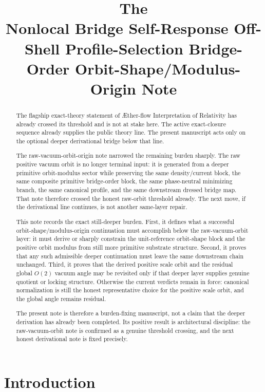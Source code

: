 \documentclass[11pt]{article}
\title{\textbf{The \TheoryName{}}\\[0.4em]
\large Nonlocal Bridge Self-Response Off-Shell Profile-Selection Bridge-Order Orbit-Shape/Modulus-Origin Note}
\author{}
\date{}
\newcommand{\Aflow}{\AE{}ther-flow}
\newcommand{\TheoryName}{\Aflow{} Interpretation of Relativity}
\begin{document}
\maketitle

\begin{abstract}
The flagship exact-theory statement of \TheoryName{} has already crossed its threshold and is not at stake here. The active exact-closure sequence already supplies the public theory line. The present manuscript acts only on the optional deeper derivational bridge below that line.

The raw-vacuum-orbit-origin note narrowed the remaining burden sharply. The raw positive vacuum orbit is no longer terminal input: it is generated from a deeper primitive orbit-modulus sector while preserving the same density/current block, the same composite primitive bridge-order block, the same phase-neutral minimizing branch, the same canonical profile, and the same downstream dressed bridge map. That note therefore crossed the honest raw-orbit threshold already. The next move, if the derivational line continues, is not another same-layer repair.

This note records the exact still-deeper burden. First, it defines what a successful orbit-shape/modulus-origin continuation must accomplish below the raw-vacuum-orbit layer: it must derive or sharply constrain the unit-reference orbit-shape block and the positive orbit modulus from still more primitive substrate structure. Second, it proves that any such admissible deeper continuation must leave the same downstream chain unchanged. Third, it proves that the derived positive scale orbit and the residual global \(O(2)\) vacuum angle may be revisited only if that deeper layer supplies genuine quotient or locking structure. Otherwise the current verdicts remain in force: canonical normalization is still the honest representative choice for the positive scale orbit, and the global angle remains residual.

The present note is therefore a burden-fixing manuscript, not a claim that the deeper derivation has already been completed. Its positive result is architectural discipline: the raw-vacuum-orbit note is confirmed as a genuine threshold crossing, and the next honest derivational note is fixed precisely.
\end{abstract}

\section{Introduction}
\end{document}
